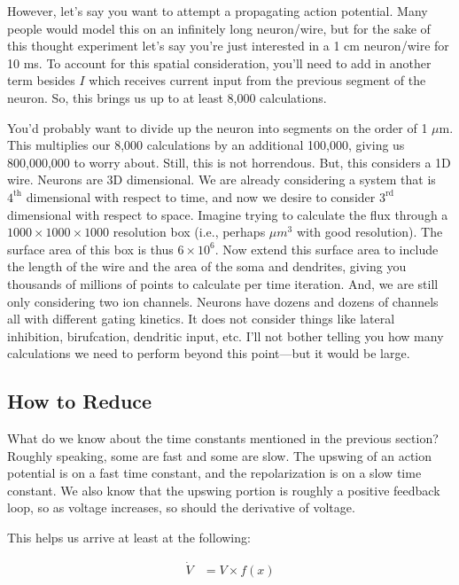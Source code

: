 \documentclass[12pt]{report}
\begin{document}
However, let's say you want to attempt a propagating action potential. Many people would model this on an infinitely long neuron/wire, but for the sake of this thought experiment let's say you're just interested in a 1 cm neuron/wire for 10 ms. To account for this spatial consideration, you'll need to add in another term besides $I$ which receives current input from the previous segment of the neuron. So, this brings us up to at least 8,000 calculations.\newline

You'd probably want to divide up the neuron into segments on the order of 1 $\mu$m. This multiplies our 8,000 calculations by an additional 100,000, giving us 800,000,000 to worry about. Still, this is not horrendous. But, this considers a 1D wire. Neurons are 3D dimensional. We are already considering a system that is $4^{\mathrm{th}}$ dimensional with respect to time, and now we desire to consider $3^{\mathrm{rd}}$ dimensional with respect to space. Imagine trying to calculate the flux through a $1000 \times 1000 \times 1000$ resolution box (i.e., perhaps $\mu m^3$ with good resolution). The surface area of this box is thus $6\times 10^6$. Now extend this surface area to include the length of the wire and the area of the soma and dendrites, giving you thousands of millions of points to calculate per time iteration. And, we are still only considering two ion channels. Neurons have dozens and dozens of channels all with different gating kinetics. It does not consider things like lateral inhibition, birufcation, dendritic input, etc. I'll not bother telling you how many calculations we need to perform beyond this point---but it would be large. 

\subsection{How to Reduce} What do we know about the time constants mentioned in the previous section? Roughly speaking, some are fast and some are slow. The upswing of an action potential is on a fast time constant, and the repolarization is on a slow time constant. We also know that the upswing portion is roughly a positive feedback loop, so as voltage increases, so should the derivative of voltage.\newline

This helps us arrive at least at the following: 

\begin{equation} \label{fn1}
\begin{split}
\dot{V} &= V \times f(x)
\end{split}
\end{equation}
\end{document}

